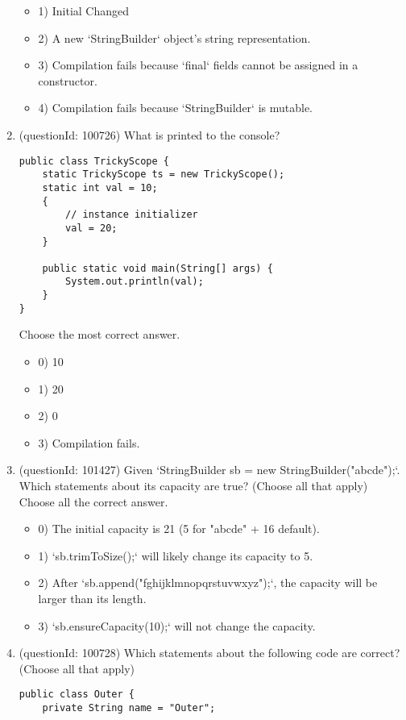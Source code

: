 \documentclass[12pt]{article}
\begin{document}
\begin{enumerate}[label=(\arabic*)]
\begin{itemize}
\item 1) Initial Changed

\item 2) A new `StringBuilder` object's string representation.

\item 3) Compilation fails because `final` fields cannot be assigned in a constructor.

\item 4) Compilation fails because `StringBuilder` is mutable.

\end{itemize}
\item (questionId: 100726) What is printed to the console?\n\begin{verbatim}
public class TrickyScope {
    static TrickyScope ts = new TrickyScope();
    static int val = 10;
    {
        // instance initializer
        val = 20;
    }

    public static void main(String[] args) {
        System.out.println(val);
    }
}
\end{verbatim}
Choose the most correct answer. 
\begin{itemize}
\item 0) 10

\item 1) 20

\item 2) 0

\item 3) Compilation fails.

\end{itemize}
\item (questionId: 101427) Given `StringBuilder sb = new StringBuilder("abcde");`. Which statements about its capacity are true? (Choose all that apply)
Choose all the correct answer.\begin{itemize}
\item 0) The initial capacity is 21 (5 for "abcde" + 16 default).

\item 1) `sb.trimToSize();` will likely change its capacity to 5.

\item 2) After `sb.append("fghijklmnopqrstuvwxyz");`, the capacity will be larger than its length.

\item 3) `sb.ensureCapacity(10);` will not change the capacity.

\end{itemize}
\item (questionId: 100728) Which statements about the following code are correct? (Choose all that apply)\n\begin{verbatim}
public class Outer {
    private String name = "Outer";


\end{verbatim}
\end{enumerate}
\end{document}
